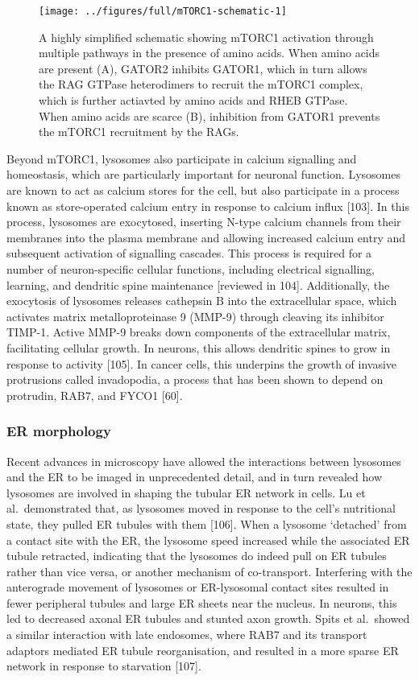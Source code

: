 \documentclass[
  12pt,
  a4paper,
]{book}
\begin{document}
\begin{figure}
\texttt{[image: ../figures/full/mTORC1-schematic-1]} \caption[mTORC1 activation schematic]{A highly simplified schematic showing mTORC1 activation through multiple pathways in the presence of amino acids.  When amino acids are present (A), GATOR2 inhibits GATOR1, which in turn allows the RAG GTPase heterodimers to recruit the mTORC1 complex, which is further actiavted by amino acids and RHEB GTPase.  When amino acids are scarce (B), inhibition from GATOR1 prevents the mTORC1 recruitment by the RAGs.}\label{fig:mTORC1-schematic}
\end{figure}

Beyond mTORC1, lysosomes also participate in calcium signalling and homeostasis, which are particularly important for neuronal function. Lysosomes are known to act as calcium stores for the cell, but also participate in a process known as store-operated calcium entry in response to calcium influx {[}103{]}. In this process, lysosomes are exocytosed, inserting N-type calcium channels from their membranes into the plasma membrane and allowing increased calcium entry and subsequent activation of signalling cascades. This process is required for a number of neuron-specific cellular functions, including electrical signalling, learning, and dendritic spine maintenance {[}reviewed in 104{]}. Additionally, the exocytosis of lysosomes releases cathepsin B into the extracellular space, which activates matrix metalloproteinase 9 (MMP-9) through cleaving its inhibitor TIMP-1. Active MMP-9 breaks down components of the extracellular matrix, facilitating cellular growth. In neurons, this allows dendritic spines to grow in response to activity {[}105{]}. In cancer cells, this underpins the growth of invasive protrusions called invadopodia, a process that has been shown to depend on protrudin, RAB7, and FYCO1 {[}60{]}.

\subsubsection{ER morphology}\label{er-morphology}

Recent advances in microscopy have allowed the interactions between lysosomes and the ER to be imaged in unprecedented detail, and in turn revealed how lysosomes are involved in shaping the tubular ER network in cells. Lu et al.~demonstrated that, as lysosomes moved in response to the cell's nutritional state, they pulled ER tubules with them {[}106{]}. When a lysosome `detached' from a contact site with the ER, the lysosome speed increased while the associated ER tubule retracted, indicating that the lysosomes do indeed pull on ER tubules rather than vice versa, or another mechanism of co-transport. Interfering with the anterograde movement of lysosomes or ER-lysosomal contact sites resulted in fewer peripheral tubules and large ER sheets near the nucleus. In neurons, this led to decreased axonal ER tubules and stunted axon growth. Spits et al.~showed a similar interaction with late endosomes, where RAB7 and its transport adaptors mediated ER tubule reorganisation, and resulted in a more sparse ER network in response to starvation {[}107{]}.
\end{document}

